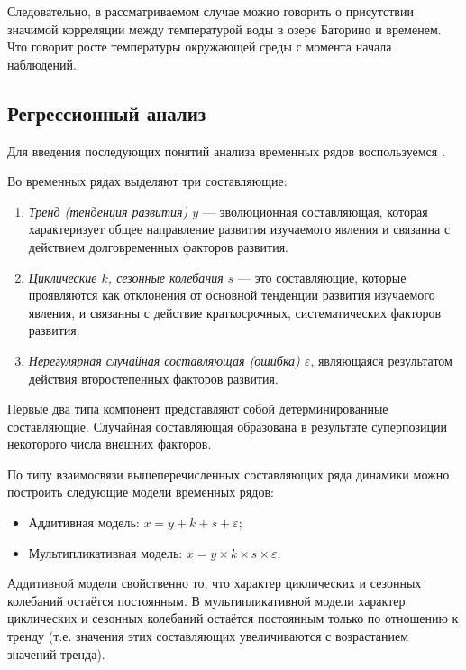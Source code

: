 Следовательно, в рассматриваемом случае можно говорить о присутствии значимой корреляции между температурой воды в озере Баторино и временем. Что говорит росте температуры окружающей среды с момента начала наблюдений.


\subsection{Регрессионный анализ} %
\label{sec:regr_analysis}

Для введения последующих понятий анализа временных рядов воспользуемся \cite{Eddows1997}.

Во временных рядах выделяют три составляющие:
\begin{enumerate}
	\item \textit{Тренд (тенденция развития) $ y $} --- эволюционная составляющая, которая характеризует общее направление развития изучаемого явления и связанна с действием долговременных факторов развития.
	\item \textit{Циклические $ k $, сезонные колебания $ s $} --- это составляющие, которые проявляются как отклонения от основной тенденции развития изучаемого явления, и связанны с действие краткосрочных, систематических факторов развития.
	\item \textit{Нерегулярная случайная составляющая (ошибка) $ \varepsilon $}, являющаяся результатом действия второстепенных факторов развития.
\end{enumerate}
Первые два типа компонент представляют собой детерминированные составляющие. Случайная составляющая образована в результате суперпозиции некоторого числа внешних факторов.

По типу взаимосвязи вышеперечисленных составляющих ряда динамики можно построить следующие модели временных рядов:
\begin{itemize}
	\item Аддитивная модель: $ x = y + k + s + \varepsilon $;
	\item Мультипликативная модель: $x = y \times k \times s \times \varepsilon$.
\end{itemize}

Аддитивной модели свойственно то, что характер циклических и сезонных колебаний остаётся постоянным. В мультипликативной модели характер циклических и сезонных колебаний остаётся постоянным только по отношению к тренду (т.е. значения этих составляющих увеличиваются с возрастанием значений тренда).

